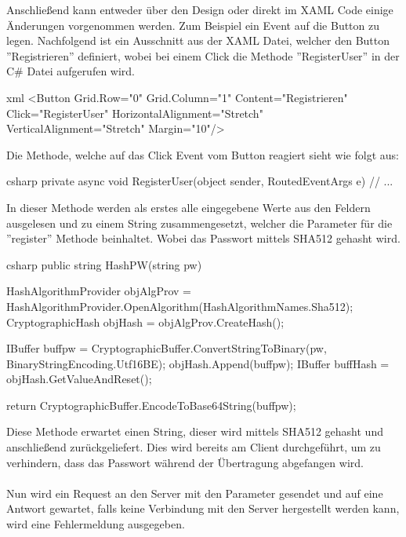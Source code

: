 Anschließend kann entweder über den Design oder direkt im XAML Code einige Änderungen vorgenommen werden. Zum Beispiel ein Event auf die Button zu legen. Nachfolgend ist ein Ausschnitt aus der XAML Datei, welcher den Button ''Registrieren'' definiert, wobei bei einem Click die Methode ''RegisterUser'' in der C\# Datei aufgerufen wird.

\begin{code}{xml}
	<Button Grid.Row="0" Grid.Column="1" Content="Registrieren" Click="RegisterUser" HorizontalAlignment="Stretch" VerticalAlignment="Stretch" Margin="10"/>
\end{code}

Die Methode, welche auf das Click Event vom Button reagiert sieht wie folgt aus:

\begin{code}{csharp}
	private async void RegisterUser(object sender, RoutedEventArgs e)
	{
		// ...
	}
\end{code}

In dieser Methode werden als erstes alle eingegebene Werte aus den Feldern ausgelesen und zu einem String zusammengesetzt, welcher die Parameter für die ''register'' Methode beinhaltet. Wobei das Passwort mittels SHA512 gehasht wird. \cite{uwphash}

\begin{code}{csharp}
	public string HashPW(string pw)
	{
		HashAlgorithmProvider objAlgProv = HashAlgorithmProvider.OpenAlgorithm(HashAlgorithmNames.Sha512);
		CryptographicHash objHash = objAlgProv.CreateHash();
		
		IBuffer buffpw = CryptographicBuffer.ConvertStringToBinary(pw, BinaryStringEncoding.Utf16BE);
		objHash.Append(buffpw);
		IBuffer buffHash = objHash.GetValueAndReset();
		
		return CryptographicBuffer.EncodeToBase64String(buffpw);
	}
\end{code}

Diese Methode erwartet einen String, dieser wird mittels SHA512 gehasht und anschließend zurückgeliefert. Dies wird bereits am Client durchgeführt, um zu verhindern, dass das Passwort während der Übertragung abgefangen wird.
\\\\
Nun wird ein Request an den Server mit den Parameter gesendet und auf eine Antwort gewartet, falls keine Verbindung mit den Server hergestellt werden kann, wird eine Fehlermeldung ausgegeben.

